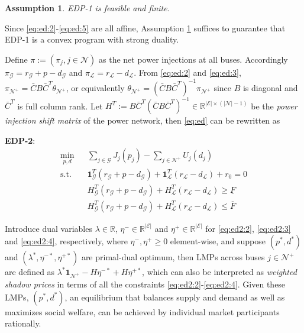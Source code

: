 \documentclass[journal,12pt,onecolumn,draftclsnofoot]{IEEEtran}
\newtheorem{assumption}{\textbf{Assumption}}
\begin{document}
\begin{assumption}\label{asp:feasiblity1}
EDP-1 is feasible and finite.	
\end{assumption}
\noindent
Since \eqref{eq:ed:2}-\eqref{eq:ed:5} are all affine, Assumption \ref{asp:feasiblity1} suffices to guarantee that EDP-1 is a convex program with strong duality.

Define $\pi:=(\pi_j,j\in\mathcal{N})$ as the net power injections at all buses. Accordingly $\pi_{\mathcal{G}}=r_\mathcal{G}+p-d_\mathcal{G}$ and $\pi_{\mathcal{L}}=r_\mathcal{L}-d_\mathcal{L}$. From \eqref{eq:ed:2} and \eqref{eq:ed:3}, $\pi_{\mathcal{N}^+}=\bar CB\bar{C}^T\theta_{\mathcal{N}^+}$, or equivalently $\theta_{\mathcal{N}^+}=(\bar CB\bar{C}^T)^{-1}\pi_{\mathcal{N}^+}$ since $B$ is diagonal and $\bar C^T$ is full column rank. Let $H^T:=B\bar C^T (\bar CB\bar{C}^T)^{-1}\in\mathbb{R}^{|\mathcal{E}|\times(|\mathcal{N}|-1)}$ be the \emph{power injection shift matrix} of the power network, then \eqref{eq:ed} can be rewritten as  

\noindent
\textbf{EDP-2}:
\begin{subequations}
	\begin{eqnarray}
	\label{eq:ed2:1}
	\min_{p,d} &&   \sum_{j\in\mathcal{G}} J_j(p_j) - \sum_{j\in\mathcal{N}^+} U_j(d_j)   \\
	\label{eq:ed2:2}
	\mathrm{s.t.} &&   \mathbf 1^T_\mathcal{G} (r_\mathcal{G}+p-d_\mathcal{G})  + \mathbf 1^T_\mathcal{L} (r_\mathcal{L}-d_\mathcal{L}) + r_0  = 0 \\
	\label{eq:ed2:3}
	&&    H^T_{\mathcal{G}}(r_\mathcal{G}+p-d_\mathcal{G}) + H^T_\mathcal{L}(r_\mathcal{L}-d_\mathcal{L}) \ge \underline{F}  \\
	\label{eq:ed2:4}
	&&  H^T_{\mathcal{G}}(r_\mathcal{G}+p-d_\mathcal{G}) + H^T_\mathcal{L}(r_\mathcal{L}-d_\mathcal{L})  \le  \overline{F}
	\end{eqnarray}	\label{eq:ed2}%
\end{subequations}
    
Introduce dual variables $\lambda\in\mathbb{R}$, $\eta^-\in\mathbb{R}^{|\mathcal{E}|}$ and $\eta^+\in\mathbb{R}^{|\mathcal{E}|}$ for \eqref{eq:ed2:2}, \eqref{eq:ed2:3} and \eqref{eq:ed2:4}, respectively, where $\eta^-,\eta^+ \ge 0$ element-wise, and suppose $(p^*,d^*)$ and $(\lambda^*,\eta^{-*},\eta^{+*})$ are primal-dual optimum, then LMPs across buses $j\in\mathcal{N}^+$ are defined as $\lambda^* \mathbf{1}_{\mathcal{N}^+} - H \eta^{-*}   + H \eta^{+*}$, which can also be interpreted as \emph{weighted shadow prices} in terms of all the constraints \eqref{eq:ed2:2}-\eqref{eq:ed2:4}. Given these LMPs, $(p^*,d^*)$, an equilibrium that balances supply and demand as well as maximizes social welfare, can be achieved by individual market participants rationally.
\end{document}
